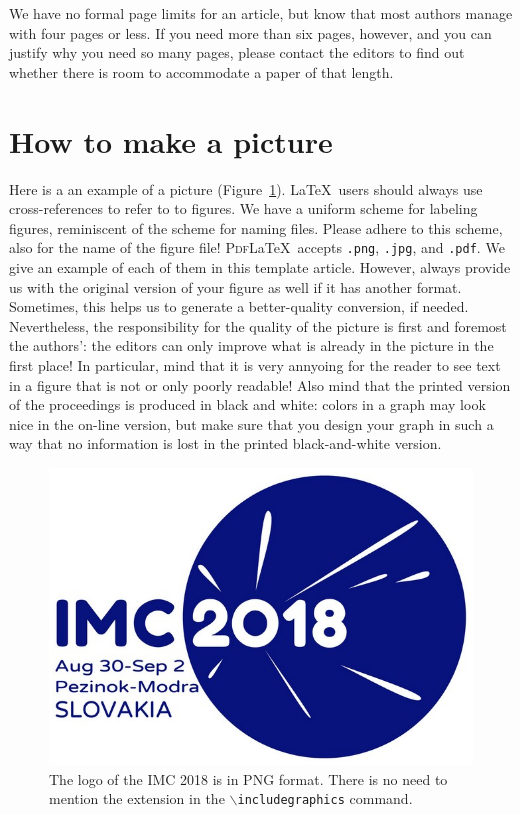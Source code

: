 \documentclass[10pt,a4paper,twoside]{article}
\begin{document}
\begin{IMCpaper}
We have no formal page limits for an article, but know that most
authors manage with four pages or less. If you need more than six
pages, however, and you can justify why you need so many pages, please
contact the editors to find out whether there is room to accommodate a
paper of that length.

\section{How to make a picture}
Here is a an example of a picture
(Figure~\ref{2018-L12-sheep-figure1}). \LaTeX\ users should always use
cross-references to refer to to figures. We have a uniform scheme for
labeling figures, reminiscent of the scheme for naming files.  Please
adhere to this scheme, also for the name of the figure file!
\textsc{Pdf}\LaTeX\ accepts \texttt{.png}, \texttt{.jpg}, and
\texttt{.pdf}. We give an example of each of them in this template
article. However, always provide us with the original version of your
figure as well if it has another format. Sometimes, this helps us to
generate a better-quality conversion, if needed.  Nevertheless, the
responsibility for the quality of the picture is first and foremost
the authors': the editors can only improve what is already in the
picture in the first place! In particular, mind that it is very annyoing
for the reader to see text in a figure that is not or only poorly
readable! Also mind that the printed version of the proceedings is
produced in black and white: colors in a graph may look nice in the
on-line version, but make sure that you design your graph in such a
way that no information is lost in the printed black-and-white
version.

\begin{figure}[htb]
\centering
\includegraphics[width = \columnwidth]{2018-L12-sheep-figure1}%
\vspace*{3pt}%
\caption{The logo of the IMC 2018 is in PNG format. There is no need
  to mention the extension in the \texttt{$\backslash$includegraphics}
  command.}
\label{2018-L12-sheep-figure1}
\end{figure}


\end{IMCpaper}
\end{document}
